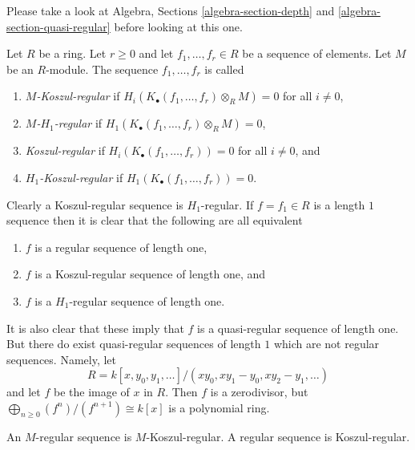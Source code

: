 \noindent
Please take a look at
Algebra, Sections \ref{algebra-section-depth} and
\ref{algebra-section-quasi-regular}
before looking at this one.

\begin{definition}
\label{definition-koszul-regular-sequence}
Let $R$ be a ring. Let $r \geq 0$ and let $f_1, \ldots, f_r \in R$
be a sequence of elements. Let $M$ be an $R$-module.
The sequence $f_1, \ldots, f_r$ is called
\begin{enumerate}
\item {\it $M$-Koszul-regular} if
$H_i(K_\bullet(f_1, \ldots, f_r) \otimes_R M) = 0$ for
all $i \not = 0$,
\item {\it $M$-$H_1$-regular} if
$H_1(K_\bullet(f_1, \ldots, f_r) \otimes_R M) = 0$,
\item {\it Koszul-regular} if $H_i(K_\bullet(f_1, \ldots, f_r)) = 0$ for
all $i \not = 0$, and
\item {\it $H_1$-Koszul-regular} if $H_1(K_\bullet(f_1, \ldots, f_r)) = 0$.
\end{enumerate}
\end{definition}

\noindent
Clearly a Koszul-regular sequence is $H_1$-regular. If $f = f_1 \in R$
is a length $1$ sequence then it is clear that the following are
all equivalent
\begin{enumerate}
\item $f$ is a regular sequence of length one,
\item $f$ is a Koszul-regular sequence of length one, and
\item $f$ is a $H_1$-regular sequence of length one.
\end{enumerate}
It is also clear that these imply that $f$ is a quasi-regular sequence
of length one. But there do exist quasi-regular sequences of length $1$
which are not regular sequences. Namely, let
$$
R = k[x, y_0, y_1, \ldots]/(xy_0, xy_1 - y_0, xy_2 - y_1, \ldots)
$$
and let $f$ be the image of $x$ in $R$. Then $f$ is a zerodivisor, but
$\bigoplus_{n \geq 0} (f^n)/(f^{n + 1}) \cong k[x]$ is a polynomial ring.

\begin{lemma}
\label{lemma-regular-koszul-regular}
An $M$-regular sequence is $M$-Koszul-regular.
A regular sequence is Koszul-regular.
\end{lemma}

